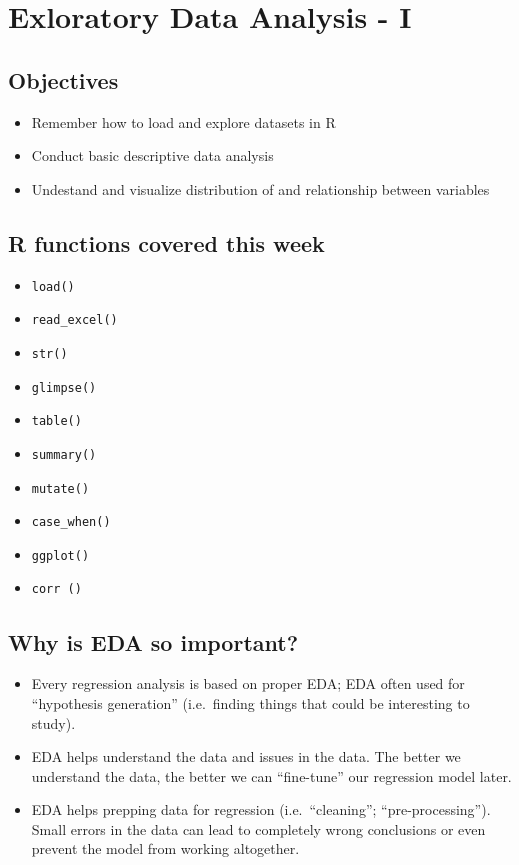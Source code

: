 \documentclass[
]{book}
\providecommand{\tightlist}{%
  \setlength{\itemsep}{0pt}\setlength{\parskip}{0pt}}
\begin{document}
\hypertarget{eda-1}{%
\chapter{Exloratory Data Analysis - I}\label{eda-1}}

\hypertarget{objectives-1}{%
\section{Objectives}\label{objectives-1}}

\begin{itemize}
\tightlist
\item
  Remember how to load and explore datasets in R
\item
  Conduct basic descriptive data analysis
\item
  Undestand and visualize distribution of and relationship between variables
\end{itemize}

\hypertarget{r-functions-covered-this-week}{%
\section{R functions covered this week}\label{r-functions-covered-this-week}}

\begin{itemize}
\tightlist
\item
  \texttt{load()}
\item
  \texttt{read\_excel()}
\item
  \texttt{str()}
\item
  \texttt{glimpse()}
\item
  \texttt{table()}
\item
  \texttt{summary()}
\item
  \texttt{mutate()}
\item
  \texttt{case\_when()}
\item
  \texttt{ggplot()}
\item
  \texttt{corr\ ()}
\end{itemize}

\hypertarget{why-is-eda-so-important}{%
\section{Why is EDA so important?}\label{why-is-eda-so-important}}

\begin{itemize}
\tightlist
\item
  Every regression analysis is based on proper EDA; EDA often used for ``hypothesis generation'' (i.e.~finding things that could be interesting to study).
\item
  EDA helps understand the data and issues in the data. The better we understand the data, the better we can ``fine-tune'' our regression model later.
\item
  EDA helps prepping data for regression (i.e.~``cleaning''; ``pre-processing''). Small errors in the data can lead to completely wrong conclusions or even prevent
  the model from working altogether.
\end{itemize}
\end{document}

